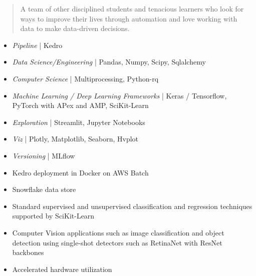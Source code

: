 \begin{quote}
\justify
A team of other disciplined students and tenacious learners who look for ways to improve their lives through automation and love working with data to make data-driven decisions.
\end{quote}


\begin{itemize}
\item \textit{Pipeline} | Kedro 
\item \textit{Data Science/Engineering} | Pandas, Numpy, Scipy, Sqlalchemy
\item \textit{Computer Science} | Multiprocessing, Python-rq
\item \textit{Machine Learning / Deep Learning Frameworks} | Keras / Tensorflow, PyTorch with APex and AMP, SciKit-Learn
\item \textit{Exploration} | Streamlit, Jupyter Notebooks
\item \textit{Viz} | Plotly, Matplotlib, Seaborn, Hvplot
\item \textit{Versioning} | MLflow

\end{itemize}

\begin{itemize}
\item Kedro deployment in Docker on AWS Batch 
\item Snowflake data store 

\end{itemize}
\begin{itemize}
\item Standard supervised and unsupervised classification and regression techniques supported by SciKit-Learn
\item Computer Vision applications such as image classification and object detection using single-shot detectors such as RetinaNet with ResNet backbones
\item Accelerated hardware utilization

\end{itemize}

